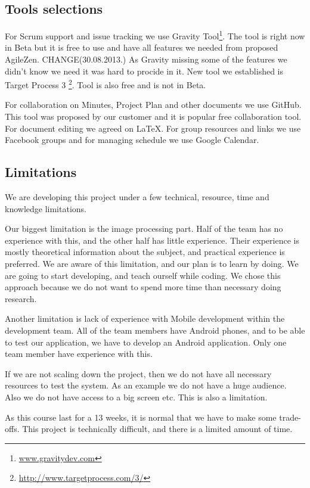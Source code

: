 \documentclass{article}
\begin{document}
\subsection{Tools selections}
For Scrum support and issue tracking we use Gravity Tool\footnote{\url{www.gravitydev.com}}. 
The tool is right now in Beta but it is free to use and have all features we needed from proposed AgileZen.
CHANGE(30.08.2013.) As Gravity missing some of the features we didn't know we need it was hard to procide in it.
New tool we established is Target Process 3 \footnote{\url{http://www.targetprocess.com/3/}}. Tool is also free and is not in Beta.

For collaboration on Minutes, Project Plan and other documents we use GitHub. This tool was proposed by our customer and it is popular free collaboration tool.
For document editing we agreed on LaTeX.
For group resources and links we use Facebook groups and for managing schedule we use Google Calendar.
 
\subsection{Limitations}
We are developing this project under a few technical, resource, time and knowledge limitations. 

Our biggest limitation is the image processing part. Half of the team has no experience with this, and the other half has little experience. Their experience is mostly theoretical information about the subject, and practical experience is preferred. We are aware of this limitation, and our plan is to learn by doing. We are going to start developing, and teach ourself while coding. We chose this approach because we do not want to spend more time than necessary doing research.

Another limitation is lack of experience with Mobile development within the development team. All of the team members have Android phones, and to be able to test our application, we have to develop an Android application. Only one team member have experience with this. 

If we are not scaling down the project, then we do not have all necessary resources to test the system. As an example we do not have a huge audience. Also  we do not have access to a big screen etc. This is also a limitation.  

As this course last for a 13 weeks, it is normal that we have to make some trade-offs.
This project is technically difficult, and there is a limited amount of time.  
  
\end{document}
